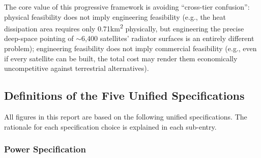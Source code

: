 The core value of this progressive framework is avoiding ``cross-tier confusion'': physical feasibility does not imply engineering feasibility (e.g., the heat dissipation area requires only 0.71\;km\textsuperscript{2} physically, but engineering the precise deep-space pointing of $\sim$6,400 satellites' radiator surfaces is an entirely different problem); engineering feasibility does not imply commercial feasibility (e.g., even if every satellite can be built, the total cost may render them economically uncompetitive against terrestrial alternatives).

\subsection{Definitions of the Five Unified Specifications}

All figures in this report are based on the following unified specifications. The rationale for each specification choice is explained in each sub-entry.

\subsubsection{Power Specification}

